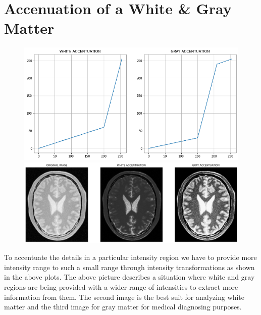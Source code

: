 \documentclass[12pt,a4paper]{article}
\begin{document}
\section{Accenuation of a White \& Gray Matter }
\begin{figure}[h]
    \centering
    \begin{minipage}[c]{.6\textwidth}
        \centering
        \includegraphics[width=.8\textwidth]{q2_1.png}
    \end{minipage}
    \begin{minipage}[c]{\textwidth}
        \centering
        \includegraphics[width=\textwidth]{q2_2.png}
    \end{minipage}
\end{figure}
To accentuate the details in a particular intensity region we have to provide more intensity range to such a small range through intensity transformations as shown in the above plots. The above picture describes a situation where white and gray regions are being provided with a wider range of intensities to extract more information from them. The second image is the best suit for analyzing white matter and the third image for gray matter for medical diagnosing purposes.
\newpage
\end{document}
